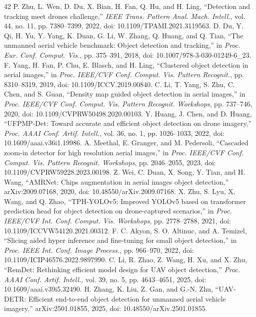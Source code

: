 \documentclass[journal]{IEEEtran}
\begin{document}
\begin{thebibliography}{42}
 P. Zhu, L. Wen, D. Du, X. Bian, H. Fan, Q. Hu, and H. Ling, ``Detection and tracking meet drones challenge,'' \emph{IEEE Trans. Pattern Anal. Mach. Intell.}, vol. 44, no. 11, pp. 7380--7399, 2022, doi: 10.1109/TPAMI.2021.3119563.
 D. Du, Y. Qi, H. Yu, Y. Yang, K. Duan, G. Li, W. Zhang, Q. Huang, and Q. Tian, ``The unmanned aerial vehicle benchmark: Object detection and tracking,'' in \emph{Proc. Eur. Conf. Comput. Vis.}, pp. 375--391, 2018, doi: 10.1007/978-3-030-01249-6\_23.
 F. Yang, H. Fan, P. Chu, E. Blasch, and H. Ling, ``Clustered object detection in aerial images,'' in \emph{Proc. IEEE/CVF Conf. Comput. Vis. Pattern Recognit.}, pp. 8310--8319, 2019, doi: 10.1109/ICCV.2019.00840.
 C. Li, T. Yang, S. Zhu, C. Chen, and S. Guan, ``Density map guided object detection in aerial images,'' in \emph{Proc. IEEE/CVF Conf. Comput. Vis. Pattern Recognit. Workshops}, pp. 737--746, 2020, doi: 10.1109/CVPRW50498.2020.00103.
 Y. Huang, J. Chen, and D. Huang, ``UFPMP-Det: Toward accurate and efficient object detection on drone imagery,'' \emph{Proc. AAAI Conf. Artif. Intell.}, vol. 36, no. 1, pp. 1026--1033, 2022, doi: 10.1609/aaai.v36i1.19986.
 A. Meethal, E. Granger, and M. Pedersoli, ``Cascaded zoom-in detector for high resolution aerial images,'' in \emph{Proc. IEEE/CVF Conf. Comput. Vis. Pattern Recognit. Workshops}, pp. 2046--2055, 2023, doi: 10.1109/CVPRW59228.2023.00198.
 Z. Wei, C. Duan, X. Song, Y. Tian, and H. Wang, ``AMRNet: Chips augmentation in aerial images object detection,'' arXiv:2009.07168, 2020, doi: 10.48550/arXiv.2009.07168.
 X. Zhu, S. Lyu, X. Wang, and Q. Zhao, ``TPH-YOLOv5: Improved YOLOv5 based on transformer prediction head for object detection on drone-captured scenarios,'' in \emph{Proc. IEEE/CVF Int. Conf. Comput. Vis. Workshops}, pp. 2778--2788, 2021, doi: 10.1109/ICCVW54120.2021.00312.
 F. C. Akyon, S. O. Altinuc, and A. Temizel, ``Slicing aided hyper inference and fine-tuning for small object detection,'' in \emph{Proc. IEEE Int. Conf. Image Process.}, pp. 966--970, 2022, doi: 10.1109/ICIP46576.2022.9897990.
 C. Li, R. Zhao, Z. Wang, H. Xu, and X. Zhu, ``RemDet: Rethinking efficient model design for UAV object detection,'' \emph{Proc. AAAI Conf. Artif. Intell.}, vol. 39, no. 5, pp. 4643--4651, 2025, doi: 10.1609/aaai.v39i5.32490.
 H. Zhang, K. Liu, Z. Gan, and G.-N. Zhu, ``UAV-DETR: Efficient end-to-end object detection for unmanned aerial vehicle imagery,'' arXiv:2501.01855, 2025, doi: 10.48550/arXiv.2501.01855.

\end{thebibliography}
\end{document}
